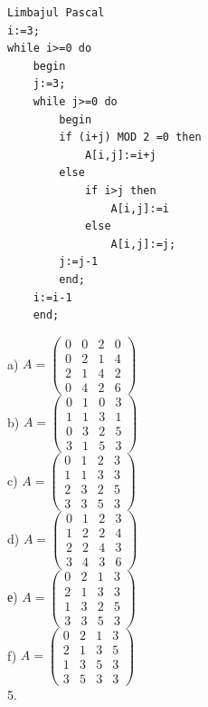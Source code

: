 \documentclass[10pt]{article}
\begin{document}
\begin{verbatim}
Limbajul Pascal
i:=3;
while i>=0 do
    begin
    j:=3;
    while j>=0 do
        begin
        if (i+j) MOD 2 =0 then
            A[i,j]:=i+j
        else
            if i>j then
                A[i,j]:=i
            else
                A[i,j]:=j;
        j:=j-1
        end;
    i:=i-1
    end;
\end{verbatim}

a) $A=\left(\begin{array}{llll}0 & 0 & 2 & 0 \\ 0 & 2 & 1 & 4 \\ 2 & 1 & 4 & 2 \\ 0 & 4 & 2 & 6\end{array}\right)$\\
b) $A=\left(\begin{array}{llll}0 & 1 & 0 & 3 \\ 1 & 1 & 3 & 1 \\ 0 & 3 & 2 & 5 \\ 3 & 1 & 5 & 3\end{array}\right)$\\
c) $A=\left(\begin{array}{llll}0 & 1 & 2 & 3 \\ 1 & 1 & 3 & 3 \\ 2 & 3 & 2 & 5 \\ 3 & 3 & 5 & 3\end{array}\right)$\\
d) $A=\left(\begin{array}{llll}0 & 1 & 2 & 3 \\ 1 & 2 & 2 & 4 \\ 2 & 2 & 4 & 3 \\ 3 & 4 & 3 & 6\end{array}\right)$\\
е) $A=\left(\begin{array}{llll}0 & 2 & 1 & 3 \\ 2 & 1 & 3 & 3 \\ 1 & 3 & 2 & 5 \\ 3 & 3 & 5 & 3\end{array}\right)$\\
f) $A=\left(\begin{array}{llll}0 & 2 & 1 & 3 \\ 2 & 1 & 3 & 5 \\ 1 & 3 & 5 & 3 \\ 3 & 5 & 3 & 3\end{array}\right)$\\
5.
\end{document}
